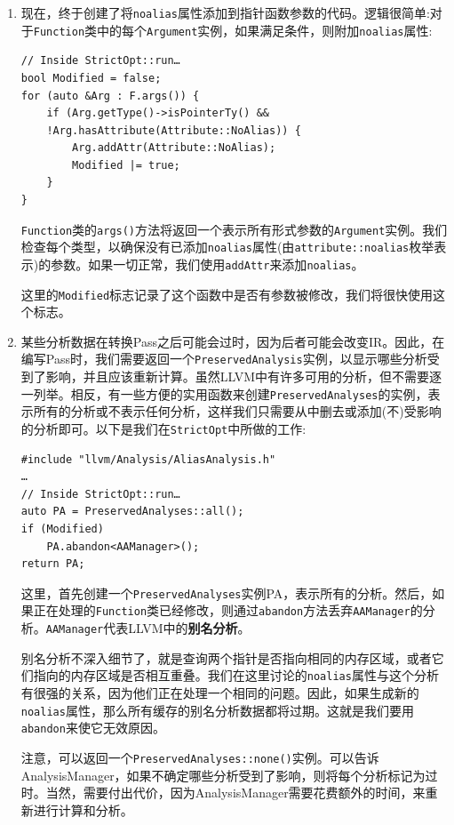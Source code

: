 \begin{enumerate}
\item 现在，终于创建了将\texttt{noalias}属性添加到指针函数参数的代码。逻辑很简单:对于\texttt{Function}类中的每个\texttt{Argument}实例，如果满足条件，则附加\texttt{noalias}属性:

\begin{lstlisting}[style=styleCXX]
// Inside StrictOpt::run…
bool Modified = false;
for (auto &Arg : F.args()) {
	if (Arg.getType()->isPointerTy() &&
	!Arg.hasAttribute(Attribute::NoAlias)) {
		Arg.addAttr(Attribute::NoAlias);
		Modified |= true;
	}
}
\end{lstlisting}

\texttt{Function}类的\texttt{args()}方法将返回一个表示所有形式参数的\texttt{Argument}实例。我们检查每个类型，以确保没有已添加\texttt{noalias}属性(由\texttt{attribute::noalias}枚举表示)的参数。如果一切正常，我们使用\texttt{addAttr}来添加\texttt{noalias}。

这里的\texttt{Modified}标志记录了这个函数中是否有参数被修改，我们将很快使用这个标志。

\item 某些分析数据在转换Pass之后可能会过时，因为后者可能会改变IR。因此，在编写Pass时，我们需要返回一个\texttt{PreservedAnalysis}实例，以显示哪些分析受到了影响，并且应该重新计算。虽然LLVM中有许多可用的分析，但不需要逐一列举。相反，有一些方便的实用函数来创建\texttt{PreservedAnalyses}的实例，表示所有的分析或不表示任何分析，这样我们只需要从中删去或添加(不)受影响的分析即可。以下是我们在\texttt{StrictOpt}中所做的工作:

\begin{lstlisting}[style=styleCXX]
#include "llvm/Analysis/AliasAnalysis.h"
…
// Inside StrictOpt::run…
auto PA = PreservedAnalyses::all();
if (Modified)
	PA.abandon<AAManager>();
return PA;
\end{lstlisting}

这里，首先创建一个\texttt{PreservedAnalyses}实例PA，表示所有的分析。然后，如果正在处理的\texttt{Function}类已经修改，则通过\texttt{abandon}方法丢弃\texttt{AAManager}的分析。\texttt{AAManager}代表LLVM中的\textbf{别名分析}。

别名分析不深入细节了，就是查询两个指针是否指向相同的内存区域，或者它们指向的内存区域是否相互重叠。我们在这里讨论的\texttt{noalias}属性与这个分析有很强的关系，因为他们正在处理一个相同的问题。因此，如果生成新的\texttt{noalias}属性，那么所有缓存的别名分析数据都将过期。这就是我们要用\texttt{abandon}来使它无效原因。

注意，可以返回一个\texttt{PreservedAnalyses::none()}实例。可以告诉AnalysisManager，如果不确定哪些分析受到了影响，则将每个分析标记为过时。当然，需要付出代价，因为AnalysisManager需要花费额外的时间，来重新进行计算和分析。


\end{enumerate}
